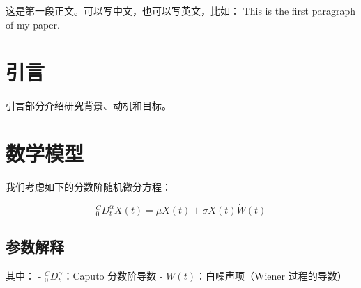 \documentclass{article}          %
\begin{document}
	
	这是第一段正文。可以写中文，也可以写英文，比如：
	This is the first paragraph of my paper.
	
	\section{引言}
	
	引言部分介绍研究背景、动机和目标。
	
	\section{数学模型}
	
	我们考虑如下的分数阶随机微分方程：
	
	\[
	{}_0^C D_t^\alpha X(t) = \mu X(t) + \sigma X(t)\dot{W}(t)
	\]
	
	\subsection{参数解释}
	
	其中：
	- \( {}_0^C D_t^\alpha \)：Caputo 分数阶导数
	- \( \dot{W}(t) \)：白噪声项（Wiener 过程的导数）
	
\end{document}
